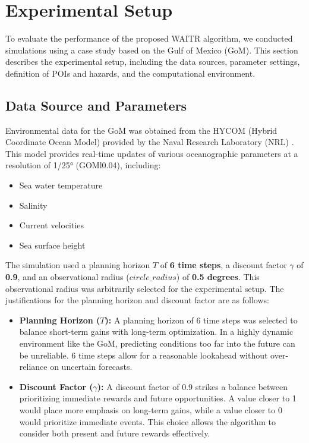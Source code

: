 \documentclass[conference]{IEEEtran}
\begin{document}
\section{Experimental Setup}

To evaluate the performance of the proposed WAITR algorithm, we conducted simulations using a case study based on the Gulf of Mexico (GoM). This section describes the experimental setup, including the data sources, parameter settings, definition of POIs and hazards, and the computational environment. 

\subsection{Data Source and Parameters}

Environmental data for the GoM was obtained from the HYCOM (Hybrid Coordinate Ocean Model) provided by the Naval Research Laboratory (NRL) \cite{chassignet2007hycom}. This model provides real-time updates of various oceanographic parameters at a resolution of 1/25° (GOMl0.04), including:

\begin{itemize}
\item Sea water temperature
\item Salinity
\item Current velocities
\item Sea surface height
\end{itemize}

\vspace{1mm}
The simulation used a planning horizon \(T\) of \textbf{6 time steps}, a discount factor \(\gamma\) of \textbf{0.9}, and an observational radius (\(circle\_radius\)) of \textbf{0.5 degrees}.  This observational radius was arbitrarily selected for the experimental setup. The justifications for the planning horizon and discount factor are as follows:

\begin{itemize}
\item \textbf{Planning Horizon (\(T\)):} A planning horizon of 6 time steps was selected to balance short-term gains with long-term optimization. In a highly dynamic environment like the GoM, predicting conditions too far into the future can be unreliable. 6 time steps allow for a reasonable lookahead without over-reliance on uncertain forecasts.
\item \textbf{Discount Factor (\(\gamma\)):} A discount factor of 0.9 strikes a balance between prioritizing immediate rewards and future opportunities. A value closer to 1 would place more emphasis on long-term gains, while a value closer to 0 would prioritize immediate events. This choice allows the algorithm to consider both present and future rewards effectively.
\end{itemize}
\end{document}
